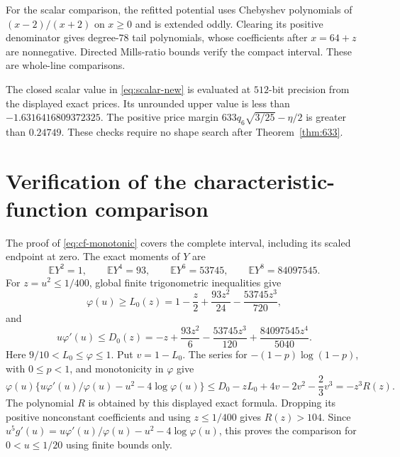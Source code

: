 \documentclass[11pt]{article}
\newcommand{\E}{\mathbb E}
\begin{document}
For the scalar comparison, the refitted potential uses Chebyshev polynomials of $(x-2)/(x+2)$ on $x\ge0$ and is extended oddly. Clearing its positive denominator gives degree-$78$ tail polynomials, whose coefficients after $x=64+z$ are nonnegative. Directed Mills-ratio bounds verify the compact interval. These are whole-line comparisons.

The closed scalar value in \eqref{eq:scalar-new} is evaluated at $512$-bit precision from the displayed exact prices. Its unrounded upper value is less than $-1.6316416809372325$. The positive price margin $633q_6\sqrt{3/25}-\eta/2$ is greater than $0.24749$. These checks require no shape search after Theorem~\ref{thm:633}.

\section{Verification of the characteristic-function comparison}\label{app:cf}
The proof of \eqref{eq:cf-monotonic} covers the complete interval, including its scaled endpoint at zero. The exact moments of $Y$ are
\begin{equation*}
 \E Y^2=1,\qquad \E Y^4=93,\qquad
 \E Y^6=53745,\qquad \E Y^8=84097545.
\end{equation*}
For $z=u^2\le1/400$, global finite trigonometric inequalities give
\begin{equation*}
 \varphi(u)\ge L_0(z)=1-\frac z2+\frac{93z^2}{24}
 -\frac{53745z^3}{720},
\end{equation*}
and
\begin{equation*}
 u\varphi'(u)\le D_0(z)=-z+\frac{93z^2}{6}
 -\frac{53745z^3}{120}+\frac{84097545z^4}{5040}.
\end{equation*}
Here $9/10<L_0\le\varphi\le1$. Put $v=1-L_0$. The series for $-(1-p)\log(1-p)$, with $0\le p<1$, and monotonicity in $\varphi$ give
\begin{equation*}
 \varphi(u)\{u\varphi'(u)/\varphi(u)-u^2-4\log\varphi(u)\}
 \le D_0-zL_0+4v-2v^2-\frac23v^3=-z^3R(z).
\end{equation*}
The polynomial $R$ is obtained by this displayed exact formula. Dropping its positive nonconstant coefficients and using $z\le1/400$ gives $R(z)>104$. Since $u^5g'(u)=u\varphi'(u)/\varphi(u)-u^2-4\log\varphi(u)$, this proves the comparison for $0<u\le1/20$ using finite bounds only.
\end{document}
